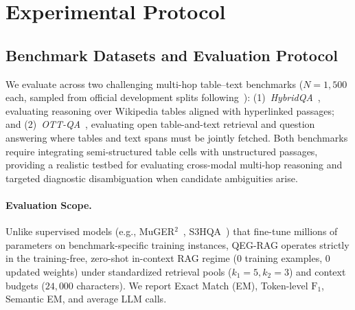 \documentclass[runningheads]{llncs}
\begin{document}
\section{Experimental Protocol}
\label{sec:experiments}

\subsection{Benchmark Datasets and Evaluation Protocol}
We evaluate across two challenging multi-hop table--text benchmarks ($N=1{,}500$ each, sampled from official development splits following~\cite{agarwal2025hybrid}): (1)~\emph{HybridQA}~\cite{hybridqa}, evaluating reasoning over Wikipedia tables aligned with hyperlinked passages; and (2)~\emph{OTT-QA}~\cite{chen2021ottqa}, evaluating open table-and-text retrieval and question answering where tables and text spans must be jointly fetched. Both benchmarks require integrating semi-structured table cells with unstructured passages, providing a realistic testbed for evaluating cross-modal multi-hop reasoning and targeted diagnostic disambiguation when candidate ambiguities arise.

\paragraph{Evaluation Scope.}
Unlike supervised models (e.g., MuGER$^2$~\cite{wang2022muger2}, S3HQA~\cite{lei2023s3hqa}) that fine-tune millions of parameters on benchmark-specific training instances, QEG-RAG operates strictly in the training-free, zero-shot in-context RAG regime (0 training examples, 0 updated weights) under standardized retrieval pools ($k_1=5, k_2=3$) and context budgets ($24{,}000$ characters). We report Exact Match (EM), Token-level $\text{F}_1$, Semantic EM, and average LLM calls.
\end{document}

